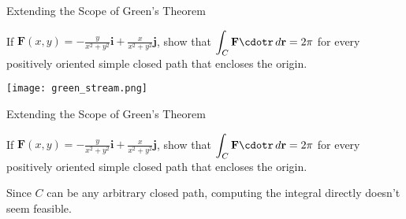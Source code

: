 \documentclass[11pt,english,
handout
]{beamer}
\begin{document}
\begin{frame}[t]{Extending the Scope of Green's Theorem}
\small
\begin{example}
If $\displaystyle \mathbf{F}(x,y)=-\frac{y}{x^2+y^2}\mathbf{i}+\frac{x}{x^2+y^2}\mathbf{j}$, show that $\displaystyle \int_C\mathbf{F}\cdotr\,d\mathbf{r}=2\pi$ for every positively oriented simple closed path that encloses the origin.\pause 

\lspace
\begin{center}
\texttt{[image: green\_stream.png]}
\end{center}
\end{example}
\end{frame}






\begin{frame}[t]{Extending the Scope of Green's Theorem}
\small
\begin{example}
If $\displaystyle \mathbf{F}(x,y)=-\frac{y}{x^2+y^2}\mathbf{i}+\frac{x}{x^2+y^2}\mathbf{j}$, show that $\displaystyle \int_C\mathbf{F}\cdotr\,d\mathbf{r}=2\pi$ for every positively oriented simple closed path that encloses the origin.

\lspace
\begin{minipage}{0.5\textwidth}
Since $C$ can be any arbitrary closed path, computing the integral directly doesn't seem feasible.   
\end{minipage}%
\begin{minipage}{0.5\textwidth}
\begin{center}
\end{center}
\end{minipage}
\end{example}
\end{frame}
\end{document}
